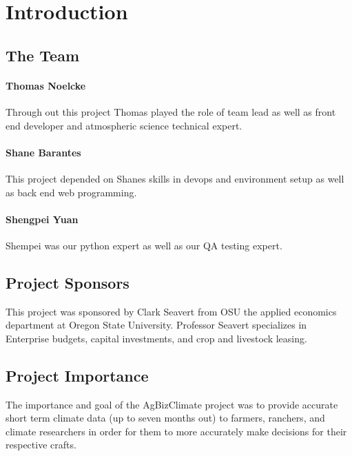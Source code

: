 \documentclass[onecolumn, draftclsnofoot,10pt, compsoc]{article}
\begin{document}
\newpage
{}
\tableofcontents
\newpage
\clearpage

\section{Introduction}

		\subsection{The Team}
		    \paragraph{Thomas Noelcke} Through out this project Thomas played the role of team lead as well as front end developer and atmospheric science technical expert.\\

		    \paragraph{Shane Barantes} This project depended on Shanes skills in devops and environment setup as well as back end web programming.\\

		    \paragraph{Shengpei Yuan} Shempei was our python expert as well as our QA testing expert.\\

		\subsection{Project Sponsors}
		    This project was sponsored by Clark Seavert from OSU the applied economics department at Oregon State University. Professor Seavert specializes in Enterprise budgets, capital investments, and crop and livestock leasing.\\

        \subsection{Project Importance}
            The importance and goal of the AgBizClimate project was to provide accurate short term climate data (up to seven months out) to farmers, ranchers, and climate researchers in order for them to more accurately make decisions for their respective crafts.
            
\end{document}
